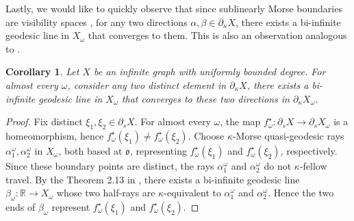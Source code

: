\documentclass[12 pt]{amsart}
\newcommand{\gothic}{\mathfrak}
\newcommand{\go}{{\gothic o}}
\newtheorem{corollary}[theorem]{Corollary}
\theoremstyle{definition}
\theoremstyle{remark}
\newcommand{\pka}{\partial_{\kappa}}
\begin{document}
Lastly, we would like to quickly observe that since sublinearly Morse boundaries are visibility spaces \cite[Theorem C]{DZ}, for any two directions $\alpha, \beta \in \pka X$, there exists a bi-infinite geodesic line in $X_\omega$ that converges to them. This is also an observation analogous to \cite[Theorem 1.13]{BM2}.
\begin{corollary}
    Let $X$ be an infinite graph with uniformly bounded degree. For almost every $\omega$, consider any two distinct element in $\pka X$,  there exists a bi-infinite geodesic line in $X_{\omega}$  that converges to these two directions in $\pka X_\omega$.
\end{corollary}
\begin{proof}

Fix distinct $\xi_1,\xi_2\in \partial_s X$. For almost every $\omega$, the map $f_\omega^\star:\partial_s X\to \partial_s X_\omega$ is a homeomorphism, hence
$f_\omega^\star(\xi_1)\neq f_\omega^\star(\xi_2)$. Choose $\kappa$-Morse
quasi-geodesic rays $\alpha_1^\omega,\alpha_2^\omega$ in $X_\omega$, both based
at $\go$, representing $f_\omega^\star(\xi_1)$ and $f_\omega^\star(\xi_2)$,
respectively. Since these boundary points are distinct, the rays
$\alpha_1^\omega$ and $\alpha_2^\omega$ do not $\kappa$-fellow travel. By the
Theorem 2.13 in \cite{DZ}, there exists a bi-infinite geodesic line
$\beta_\omega:\mathbb{R}\to X_\omega$ whose two half-rays are $\kappa$-equivalent
to $\alpha_1^\omega$ and $\alpha_2^\omega$. Hence the two ends of $\beta_\omega$
represent $f_\omega^\star(\xi_1)$ and $f_\omega^\star(\xi_2)$.

\end{proof}
\end{document}
